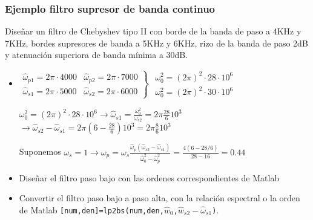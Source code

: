 \begin{frame}
\frametitle{Ejemplo filtro supresor de banda continuo}

\vspace{-0.1cm}

\footnotesize

\color{olivegreen}Diseñar un filtro de Chebyshev tipo II con borde de la banda de paso a 4KHz y 7KHz, bordes supresores de banda a 5KHz y 6KHz, rizo de la banda de paso 2dB y atenuación superiora de banda mínima a 30dB.

\vspace{-0.1cm}

\color{gray}
\begin{itemize}

\scriptsize
\item $\left . \begin{array}{ll}\hat \omega_{p1}=2\pi \cdot 4000 & \hat \omega_{p2}=2\pi \cdot 7000\\\hat \omega_{s1}=2\pi \cdot 5000 & \hat \omega_{s2}=2\pi \cdot 6000\end{array}\right \}$ $\begin{array}{l}\omega_0^2=(2\pi)^2 \cdot 28 \cdot 10^6\\ \omega_0^2=(2\pi)^2 \cdot 30 \cdot 10^6\end{array} $



$\omega_0^2\!=\!(2\pi)^2 \!\cdot \!28 \!\cdot 10^6 \rightarrow  \hat \omega_{s1}\!=\!\frac{\omega_0^2}{\omega_{s2}}\!=\!2\pi \frac{28}{6}10^3$ $\rightarrow \hat \omega_{s2}\!-\!\hat \omega_{s1}\!=\!2\pi(6\!-\!\frac{28}{6})10^3 \!=\!2\pi \frac{8}{6}10^3 $

\vspace{-0.1cm}

Suponemos $\omega_s=1 \rightarrow \omega_p=\omega_s\frac{\hat \omega_p (\hat \omega_{s2}-\hat \omega_{s1})}{\hat \omega_0^2-\hat \omega_p^2}=\frac{4(6-28/6)}{28-16}=0.44$

 \footnotesize

\item Diseñar el filtro paso bajo con las ordenes correspondientes de Matlab

\item Convertir el filtro paso bajo a paso alta, con la relación espectral o la orden de Matlab  \alert{\texttt{[num,den]=lp2bs(num,den,$\hat{w}_0$,$\hat{w}_{s2}-\hat \omega_{s1}$)}}.

\end{itemize}


\end{frame}
